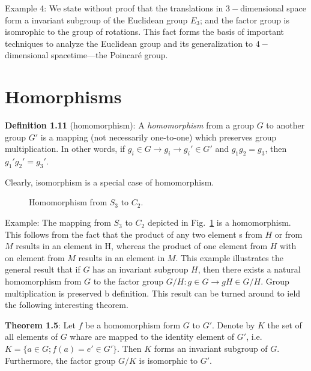 \textrm{Example 4}: We state without proof that the translations in $3-$dimensional space form a invariant subgroup of the Euclidean group $E_{3}$; and the factor group is isomrophic to the group of rotations.
This fact forms the basis of important techniques to analyze the Euclidean group and its generalization to $4-$dimensional spacetime---the Poincar\'{e} group.

\section{Homorphisms}
\textbf{Definition 1.11} (homomorphism): A \textit{homomorphism} from a group $G$ to another group $G'$ is a mapping (not necessarily one-to-one) which preserves group multiplication.
In other words, if $g_{i} \in G \to g_{i} \to g_{i}' \in G'$ and $g_{1}g_{2}=g_{3}$, then $g_{1}'g_{2}'=g_{3}'$.

Clearly, isomorphism is a special case of homomorphism.
\begin{figure}
  \centering
  \caption{Homomorphism from $S_3$ to $C_2$.}
  \label{fig:1-4}
\end{figure}

\textrm{Example}:  The mapping from $S_{3}$ to $C_{2}$ depicted in Fig.~\ref{fig:1-4} is a homomorphism.
This follows from the fact that the product of any two element s from $H$ or from $M$ results in an element in H, whereas the product of one element from $H$ with on element from $M$ results in an element in $M$.
This example illustrates the general result that if $G$ has an invariant subgroup $H$, then there exists a natural homomorphism from $G$ to the factor group $G/H: g\in G \to gH \in G/H$.
Group multiplication is preserved b definition.
This result can be turned around to ield the following interesting theorem.

\textbf{Theorem 1.5}: Let $f$ be a homomorphism form $G$ to $G'$.
Denote by $K$ the set of all elements of $G$ whare are mapped to the identity element of $G'$, i.e. $K= \{a \in G; f(a) = e' \in G'\}$.
Then $K$ forms an invariant subgroup of $G$.
Furthermore, the factor group $G/K$ is isomorphic to $G'$.

